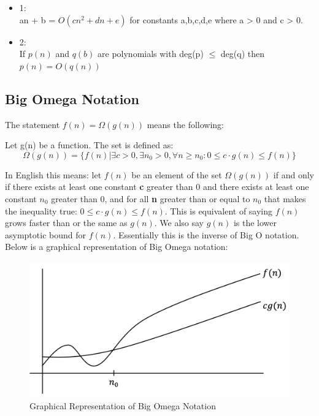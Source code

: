 \documentclass{article}
\begin{document}
\begin{itemize}
    \item 1: \\ an + b = $O(cn^2 +dn + e)$ for constants a,b,c,d,e where a > 0 and c > 0.

    \item 2: \\ If $p(n)$ and $q(b)$ are polynomials with deg(p) $\leq$ deg(q) then $p(n) = O(q(n))$
    
\end{itemize}

\subsection{Big Omega Notation}

The statement $f(n) = \Omega(g(n))$ means the following:

Let g(n) be a function. The set is defined as:
$$ \Omega(g(n)) = \{ f(n) | \exists c > 0 , \exists n_0 > 0, \forall n \geq n_0 : 0 \leq c \cdot g(n) \leq f(n) \}$$ 

In English this means: let $f(n)$ be an element of the set $\Omega(g(n))$ if and only if there exists at least one constant \textbf{c} greater than 0 and there exists at least one constant \textbf{$n_0$} greater than 0, and for all \textbf{n} greater than or equal to \textbf{$n_0$} that makes the inequality true: $0 \leq c \cdot g(n) \leq f(n)$. This is equivalent of saying $f(n)$ grows faster than or the same as $g(n)$. We also say $g(n)$ is the lower asymptotic bound for $f(n)$. Essentially this is the inverse of Big O notation. Below is a graphical representation of Big Omega notation:

\begin{figure}[H]
    \centering
    \includegraphics[scale=.4]{Figures/cse102lecture1example2.png}
    \caption{Graphical Representation of Big Omega Notation}
    \label{lecture1example2}
\end{figure}
\end{document}
